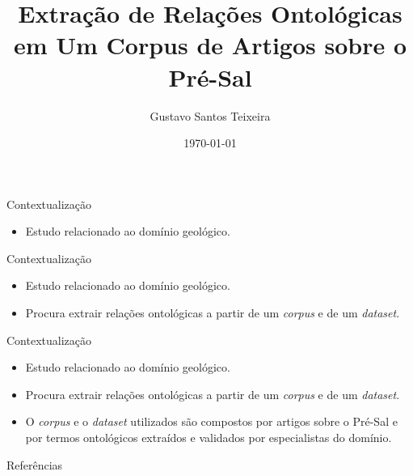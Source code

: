\documentclass[aspectratio=169]{beamer}
\title{Extração de Relações Ontológicas em Um Corpus de Artigos sobre o Pré-Sal}
\author{Gustavo Santos Teixeira}
\institute{Universidade Federal do Rio Grande do Sul}
\date{\today}
\begin{document}
\begin{frame}
    \titlepage
\end{frame}





\begin{frame}{Contextualização}
\begin{itemize}
    \item Estudo relacionado ao domínio geológico.
\end{itemize}
\end{frame}



\begin{frame}{Contextualização}
\begin{itemize}
    \item Estudo relacionado ao domínio geológico.
    \item Procura extrair relações ontológicas a partir de um \textit{corpus} e de um \textit{dataset}.
\end{itemize}
\end{frame}





\begin{frame}{Contextualização}
\begin{itemize}
   \item Estudo relacionado ao domínio geológico.
    \item Procura extrair relações ontológicas a partir de um \textit{corpus} e de um \textit{dataset}.
    \item O \textit{corpus} e o \textit{dataset} utilizados são compostos por artigos sobre o Pré-Sal e por termos ontológicos extraídos e validados por especialistas do domínio.
\end{itemize}
\end{frame}




\begin{frame}{Referências}


\end{frame}
\end{document}
